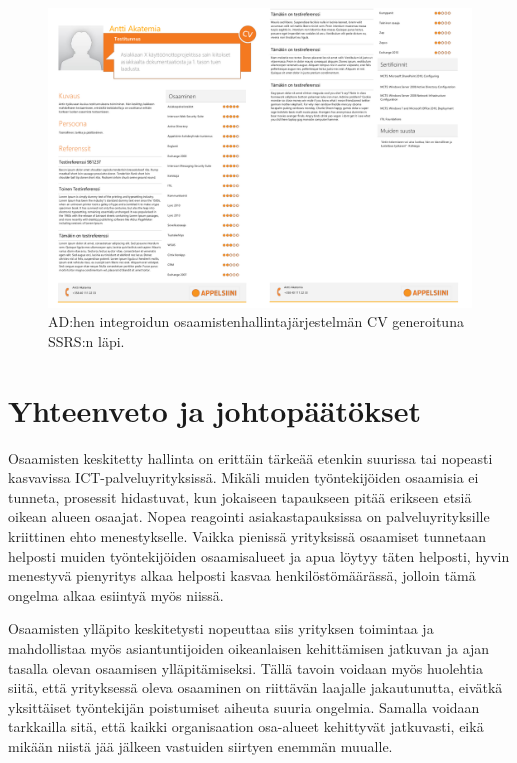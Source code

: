 \documentclass[a4paper,finnish,12pt]{article}
\begin{document}
\begin{figure}
\centering
\includegraphics[width=1\textwidth]{Akatemia_sampleCV.png}
\caption{AD:hen integroidun osaamistenhallintajärjestelmän CV generoituna SSRS:n läpi.}
\label{fig:sampleCV}
\end{figure}

\clearpage

\section{Yhteenveto ja johtopäätökset}

Osaamisten keskitetty hallinta on erittäin tärkeää etenkin suurissa tai nopeasti kasvavissa ICT-palveluyrityksissä. Mikäli muiden työntekijöiden osaamisia ei tunneta, prosessit hidastuvat, kun jokaiseen tapaukseen pitää erikseen etsiä oikean alueen osaajat. Nopea reagointi asiakastapauksissa on palveluyrityksille kriittinen ehto menestykselle. Vaikka pienissä yrityksissä osaamiset tunnetaan helposti muiden työntekijöiden osaamisalueet ja apua löytyy täten helposti, hyvin menestyvä pienyritys alkaa helposti kasvaa henkilöstömäärässä, jolloin tämä ongelma alkaa esiintyä myös niissä.

Osaamisten ylläpito keskitetysti nopeuttaa siis yrityksen toimintaa ja mahdollistaa myös asiantuntijoiden oikeanlaisen kehittämisen jatkuvan ja ajan tasalla olevan osaamisen ylläpitämiseksi. Tällä tavoin voidaan myös huolehtia siitä, että yrityksessä oleva osaaminen on riittävän laajalle jakautunutta, eivätkä yksittäiset työntekijän poistumiset aiheuta suuria ongelmia. Samalla voidaan tarkkailla sitä, että kaikki organisaation osa-alueet kehittyvät jatkuvasti, eikä mikään niistä jää jälkeen vastuiden siirtyen enemmän muualle.
\end{document}
